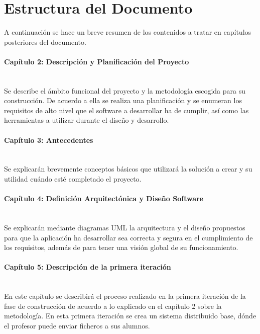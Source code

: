 \section{Estructura del Documento}
\label{sec:intr:organization}

A continuación se hace un breve resumen de los contenidos a tratar en capítulos posteriores del documento.

\paragraph{Capítulo 2: Descripción y Planificación del Proyecto} \ \\

Se describe el ámbito funcional del proyecto y la metodología escogida para su construcción. De acuerdo a ella se realiza una planificación y se enumeran los requisitos de alto nivel que el software a desarrollar ha de cumplir, así como las herramientas a utilizar durante el diseño y desarrollo.


\paragraph{Capítulo 3: Antecedentes} \ \\


Se explicarán brevemente conceptos básicos que utilizará la solución a crear y su utilidad cuándo esté completado el proyecto.


\paragraph{Capítulo 4: Definición Arquitectónica y Diseño Software} \ \\


Se explicarán mediante diagramas UML la arquitectura y el diseño propuestos para que la aplicación ha desarrollar  sea correcta y segura en el cumplimiento de los requisitos, además de para tener una visión global de su funcionamiento.


\paragraph{Capítulo 5: Descripción de la primera iteración} \ \\


En este capítulo se describirá el proceso realizado en la primera iteración de la fase de construcción de acuerdo a lo explicado en el capítulo 2 sobre la metodología. En esta primera iteración se crea un sistema distribuido base, dónde el profesor puede enviar ficheros a sus alumnos.


